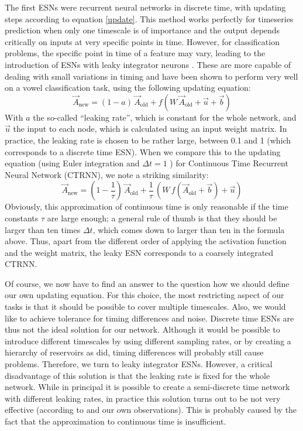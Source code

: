 \documentclass[10pt,a4paper]{report}
\begin{document}
The first ESNs were recurrent neural networks in discrete time, with updating steps according to equation \ref{update}. This method works perfectly for timeseries prediction when only one timescale is of importance and the output depends critically on inputs at very specific points in time. However, for classification problems, the specific point in time of a feature may vary, leading to the introduction of ESNs with leaky integrator neurons \citep{Jaeger2007a}. These are more capable of dealing with small variations in timing and have been shown to perform very well on a vowel classification task, using the following updating equation:
\begin{equation}
 \vec{A}_{\text{new}} = (1 - a) \, \vec{A}_{\text{old}} + f(W \, \vec{A}_{\text{old}} + \vec{u} + \vec{b} ) 
 \label{leaky}
\end{equation}
With $a$ the so-called ``leaking rate'', which is constant for the whole network, and $\vec{u}$ the input to each node, which is calculated using an input weight matrix. In practice, the leaking rate is chosen to be rather large, between 0.1 and 1 (which corresponds to a discrete time ESN). When we compare this to the updating equation (using Euler integration and $\Delta t = 1$ ) for Continuous Time Recurrent Neural Network (CTRNN), we note a striking similarity:
\begin{equation}
 \vec{A}_{\text{new}} = (1 - \frac{1}{\tau}) \, \vec{A}_{\text{old}} + \frac{1}{\tau} \, (W \, f(\vec{A}_{\text{old}} + \vec{b} )  + \vec{u} ) 
 \label{ctrnn}
\end{equation}
Obviously, this approximation of continuous time is only reasonable if the time constants $\tau$ are large enough; a general rule of thumb is that they should be larger than ten times $\Delta t$, which comes down to larger than ten in the formula above. Thus, apart from the different order of applying the activation function and the weight matrix, the leaky ESN corresponds to a coarsely integrated CTRNN.

Of course, we now have to find an answer to the question how we should define our own updating equation. For this choice, the most restricting aspect of our tasks is that it should be possible to cover multiple timescales. Also, we would like to achieve tolerance for timing differences and noise. Discrete time ESNs are thus not the ideal solution for our network. Although it would be possible to introduce different timescales by using different sampling rates, or by creating a hierarchy of reservoirs as \citet{Jaeger2007} did, timing differences will probably still cause problems. Therefore, we turn to leaky integrator ESNs. However, a critical disadvantage of this solution is that the leaking rate is fixed for the whole network. While in principal it is possible to create a semi-discrete time network with different leaking rates, in practice this solution turns out to be not very effective (according to \citet{Jaeger2007a} and our own observations). This is probably caused by the fact that the approximation to continuous time is insufficient.
\end{document}
